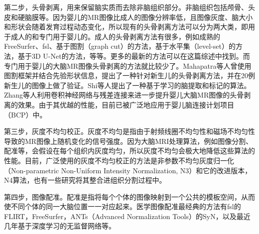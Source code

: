 第二步，头骨剥离，用来保留脑实质而去除非脑组织部分。非脑组织包括颅骨、头皮和硬脑膜等。因为婴儿的MR图像比成人的图像分辨率低，且图像灰度、脑大小和形状会随着发育过程动态变化，所以现有的头骨剥离方法可以分为两大类，即用于成人的和专门用于婴儿的。成人的头骨剥离方法有很多，例如成熟的FreeSurfer\cite{fischl2012freesurfer}、fsl\cite{jenkinson2012fsl}、基于图割（graph cut）的方法\cite{sadananthan2010skull}，基于水平集（level-set）的方法\cite{zhuang2006skull}，基于3D U-Net的方法\cite{hwang20193d}，等等。更多的最新的方法可以在这篇综述中找到\cite{kalavathi2016methods}。而专门用于婴儿的大脑MR图像头骨剥离的方法就比较少了。Mahapatra等人\cite{mahapatra2012skull}曾使用图割框架并结合先验形状信息，提出了一种针对新生儿的头骨剥离方法，并在20例新生儿的图像上做了验证。Shi等人\cite{shi2012label}提出了一种基于学习的脑提取和标记的算法。Zhang等人\cite{zhang2019frnet}利用卷积神经网络与残差连接来进一步提升婴儿大脑MR图像的头骨剥离的效果。由于其优越的性能，目前已被广泛地应用于婴儿脑连接计划项目（BCP）中。

第三步，灰度不均匀校正\cite{belaroussi2006intensity}。灰度不均匀是指由于射频线圈不均匀性和磁场不均匀性\cite{vovk2007review}导致的MR图像上随机变化的信号强度。因为大脑MRI处理算法，例如图像分割、配准等，会假设在每个组织内灰度均匀，所以灰度不均匀会极大地降低这些算法的性能。目前，广泛使用的灰度不均匀校正的方法是非参数不均匀灰度归一化（Non-parametric Non-Uniform Intensity Normalization, N3）\cite{sled1998nonparametric}和它的改进版本，N4算法\cite{tustison2010n4itk}，也有一些研究将其整合进组织分割过程中\cite{wang2011automatic}。

第四步，图像配准\cite{sotiras2013deformable}。配准是指将每个个体的图像映射到一个公共的模板空间，从而使不同个体的同一大脑位置一一对应起来。医学图像配准最经典的方法有fsl的FLIRT\cite{jenkinson2001global,jenkinson2002improved}，FreeSurfer\cite{fischl2012freesurfer}，ANTs（Advanced Normalization Tools）的SyN\cite{avants2008symmetric}，以及最近几年基于深度学习的无监督网络\cite{dalca2018unsupervised,balakrishnan2018unsupervised,niethammer2019metric,de2019deep}等。

